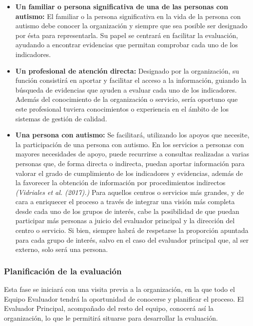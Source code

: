 \begin{itemize}
	\item \textbf{Un familiar o persona significativa de una de las personas con
	autismo: }El familiar o la persona significativa en la vida de la persona
	con autismo debe conocer la organización y siempre que sea posible ser
	designado por ésta para representarla. Su papel se centrará en facilitar la
	evaluación, ayudando a encontrar evidencias que permitan comprobar cada uno
	de los indicadores. 
	\item \textbf{Un profesional de atención directa: }Designado por la
	organización, su función consistirá en aportar y facilitar el acceso a la
	información, guiando la búsqueda de evidencias que ayuden a evaluar cada uno
	de los indicadores. Además del conocimiento de la organización o servicio,
	sería oportuno que este profesional tuviera conocimientos o experiencia en
	el ámbito de los sistemas de gestión de calidad. 
	\item \textbf{Una persona con autismo: }Se facilitará, utilizando los apoyos
	que necesite, la participación de una persona con autismo. En los servicios
	a personas con mayores necesidades de apoyo, puede recurrirse a consultas
	realizadas a varias personas que, de forma directa o indirecta, puedan
	aportar información para valorar el grado de cumplimiento de los indicadores
	y evidencias, además de la favorecer la obtención de información por
	procedimientos indirectos \textit{(Vidriales et al. (2017).)} Para aquellos centros o
	servicios más grandes, y de cara a enriquecer el proceso a través de
	integrar una visión más completa desde cada uno de los grupos de interés,
	cabe la posibilidad de que puedan participar más personas a juicio del
	evaluador principal y la dirección del centro o servicio. Si bien, siempre
	habrá de respetarse la proporción apuntada para cada grupo de interés, salvo
	en el caso del evaluador principal que, al ser externo, solo será una
	persona.
	
\end{itemize}

\subsubsection{Planificación de la evaluación}
Esta fase se iniciará con una visita previa a la organización, en la que todo el
Equipo Evaluador tendrá la oportunidad de conocerse y planificar el proceso. El
Evaluador Principal, acompañado del resto del equipo, conocerá así la
organización, lo que le permitirá situarse para desarrollar la evaluación.  
 
